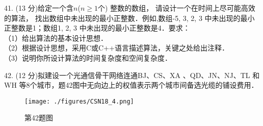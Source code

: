41. (13 分)给定一个含$n$($n\geqslant1$个) 整数的数组， 请设计一个在时间上尽可能高效的算法， 找出数组中未出现的最小正整数．例如,数组{-5, 3, 2, 3} 中未出现的最小正整数是1；数组{1, 2, 3} 中未出现的最小正整数是4．要求： \\
（1）给出算法的基本设计思想． \\
（2）根据设计思想，采用C或C++语言描述算法，关键之处给出注释． \\
（3）说明你所设计算法的时间复杂度和空间复杂度．

42. (12 分)拟建设一个光通信骨干网络连通BJ、CS、XA 、QD、JN、NJ、TL 和WH 等8个城市，题42图中无向边上的权值表示两个城市间备选光缆的铺设费用．
\begin{figure}[ht]
\centering
\texttt{[image: ./figures/CSN18\_4.png]}
\caption{第42题图} \label{CSN18_fig4}
\end{figure}

